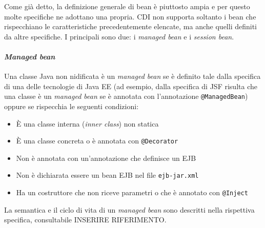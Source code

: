 Come già detto, la definizione generale di bean è piuttosto ampia e per questo molte specifiche ne adottano una propria. CDI non supporta soltanto i bean che rispecchiano le caratteristiche precedentemente elencate, ma anche quelli definiti da altre specifiche. I principali sono due: i \textit{managed bean} e i \textit{session bean}.

\paragraph{\textit{Managed bean}} Una classe Java non nidificata è un \textit{managed bean} se è definito tale dalla specifica di una delle tecnologie di Java EE (ad esempio, dalla specifica di JSF risulta che una classe è un \textit{managed bean} se è annotata con l'annotazione \lstinline{@ManagedBean}) oppure se rispecchia le seguenti condizioni:
\begin{itemize}
\item È una classe interna (\textit{inner class}) non statica
\item È una classe concreta o è annotata con \lstinline{@Decorator}
\item Non è annotata con un'annotazione che definisce un EJB
\item Non è dichiarata essere un bean EJB nel file \texttt{ejb-jar.xml}
\item Ha un costruttore che non riceve parametri o che è annotato con \lstinline{@Inject}
\end{itemize}

La semantica e il ciclo di vita di un \textit{managed bean} sono descritti nella rispettiva specifica, consultabile INSERIRE RIFERIMENTO.

